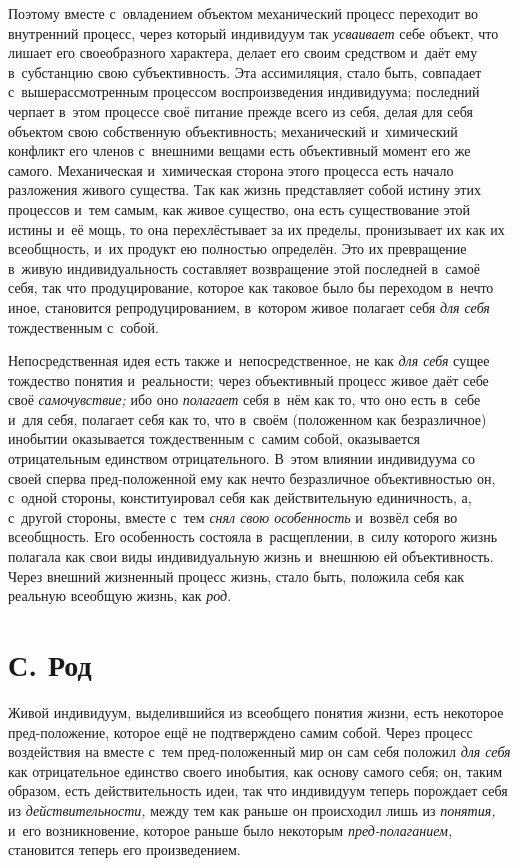 Поэтому вместе с~овладением объектом механический процесс
переходит во внутренний процесс, через который индивидуум так
{\em усваивает} себе
объект, что лишает его своеобразного характера, делает его своим средством
и~даёт ему в~субстанцию свою субъективность. Эта ассимиляция, стало быть,
совпадает с~вышерассмотренным процессом воспроизведения индивидуума;
последний черпает в~этом процессе своё питание прежде всего из себя,
делая для себя объектом свою собственную объективность;
механический и~химический конфликт его членов с~внешними вещами есть
объективный момент его же самого. Механическая и~химическая сторона этого
процесса есть начало разложения живого существа. Так как жизнь представляет
собой истину этих процессов и~тем самым, как живое существо, она есть
существование этой истины и~её мощь, то она перехлёстывает за их пределы,
пронизывает их как их всеобщность, и~их продукт ею полностью определён. Это
их превращение в~живую индивидуальность составляет возвращение этой
последней в~самоё себя, так что продуцирование, которое как таковое было бы
переходом в~нечто иное, становится репродуцированием, в~котором живое
полагает себя {\em для себя}
тождественным с~собой.

Непосредственная идея есть также и~непосредственное, не как
{\em для себя} сущее
тождество понятия и~реальности; через объективный процесс живое даёт себе
своё {\em самочувствие;} ибо оно {\em полагает}
себя в~нём как то, что оно есть в~себе и~для себя, полагает
себя как то, что в~своём (положенном как безразличное) инобытии оказывается
тождественным с~самим собой, оказывается отрицательным единством
отрицательного. В~этом влиянии индивидуума со своей сперва пред-положенной
ему как нечто безразличное объективностью он, с~одной стороны,
конституировал себя как действительную единичность, а, с~другой стороны,
вместе с~тем {\em снял свою
особенность} и~возвёл себя во всеобщность. Его особенность
состояла в~расщеплении, в~силу которого жизнь полагала как свои виды
индивидуальную жизнь и~внешнюю ей объективность. Через внешний жизненный
процесс жизнь, стало быть, положила себя как реальную всеобщую жизнь, как
{\em род}.

\section[С. Род]{С. Род}

Живой индивидуум, выделившийся из всеобщего понятия жизни,
есть некоторое пред-положение, которое ещё не подтверждено самим собой.
Через процесс воздействия на вместе с~тем пред-положенный мир он сам себя
положил {\em для себя}
как отрицательное единство своего инобытия, как основу самого
себя; он, таким образом, есть действительность идеи, так что индивидуум
теперь порождает себя из
{\em действительности,}
между тем как раньше он происходил лишь из
{\em понятия,} и~его
возникновение, которое раньше было некоторым
{\em пред-полаганием,}
становится теперь его произведением.

